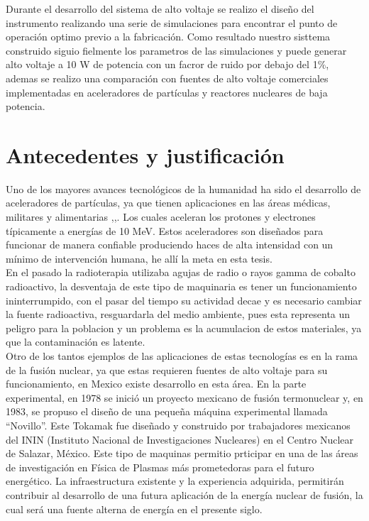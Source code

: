 Durante el desarrollo del sistema de alto voltaje se realizo el diseño del instrumento realizando una serie de simulaciones para encontrar el punto de operación optimo previo a la fabricación. Como resultado nuestro sisttema construido siguio fielmente los parametros de las simulaciones y puede generar alto voltaje a 10 W de potencia con un facror de ruido por debajo del 1$\%$, ademas se realizo una comparación con fuentes de alto voltaje comerciales implementadas en aceleradores de partículas y reactores nucleares de baja potencia.


\section{Antecedentes y justificación}


Uno de los mayores avances tecnológicos de la humanidad ha sido el desarrollo de aceleradores de partículas, ya que tienen aplicaciones en las áreas médicas, militares y alimentarias \cite{ProyectoLNLS5},\cite{neutrons1},\cite{leonard}. Los cuales aceleran los protones y electrones típicamente a energías de 10 MeV. Estos aceleradores son diseñados para funcionar de manera confiable produciendo haces de alta intensidad con un mínimo de intervención humana, he allí la meta en esta tesis.\\

En el pasado la radioterapia utilizaba agujas de radio o rayos gamma de cobalto radioactivo\cite{cobalt}, la desventaja de este tipo de maquinaria es tener un funcionamiento ininterrumpido, con el pasar del tiempo su actividad decae y es necesario cambiar la fuente radioactiva, resguardarla del medio ambiente, pues esta representa un peligro para la poblacion y un problema es la acumulacion de estos materiales, ya que la contaminación es latente.\cite{C1}\\

Otro de los tantos ejemplos de las aplicaciones de estas tecnologías es en la rama de la fusión nuclear, ya que estas requieren fuentes de alto voltaje para su funcionamiento, en Mexico existe desarrollo en esta área. En la parte experimental, en 1978 se inició un proyecto mexicano de fusión termonuclear y, en 1983, se propuso el diseño de una pequeña máquina experimental llamada “Novillo”\cite{novillo}. Este Tokamak fue diseñado y construido por trabajadores mexicanos del ININ (Instituto Nacional de Investigaciones Nucleares)\cite{inin} en el Centro Nuclear de Salazar, México. Este tipo de maquinas  permitio prticipar en una de las áreas de investigación en Física de Plasmas más prometedoras para el futuro energético. La infraestructura existente y la experiencia adquirida, permitirán contribuir al desarrollo de una futura aplicación de la energía nuclear de fusión, la cual será una fuente alterna de energía en el presente siglo. \\

